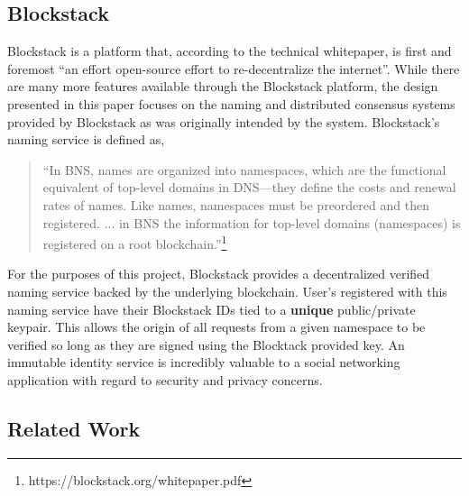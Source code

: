 \documentclass[pageno]{jpaper}
\newcommand{\quotes}[1]{``#1''}
\begin{document}
\begin{multicols*}{2}
\subsection{Blockstack}
\label{section:blockstack}

Blockstack\cite{blockstack1} is a platform that, according to the technical whitepaper, is first and foremost \quotes{an effort open-source effort to re-decentralize the internet}. While there are many more features available through the Blockstack platform, the design presented in this paper focuses on the naming and distributed consensus systems provided by Blockstack as was originally intended by the system\cite{blockstack2}. Blockstack's naming service is defined as,\newline

\begin{quote}
	\quotes{In BNS, names are organized into namespaces, which are the functional equivalent of top-level domains in DNS—they define the costs and renewal rates of names. Like names, namespaces must be preordered and then registered. ... in BNS the information for top-level domains (namespaces) is registered on a
		root blockchain.}\footnote{https://blockstack.org/whitepaper.pdf}
\end{quote}

For the purposes of this project, Blockstack provides a decentralized verified naming service backed by the underlying blockchain. User's registered with this naming service have their Blockstack IDs tied to a \textbf{unique} public/private keypair. This allows the origin of all requests from a given namespace to be verified so long as they are signed using the Blocktack provided key. An immutable identity service is incredibly valuable to a social networking application with regard to security and privacy concerns. 

\subsection{Related Work}
\label{section:related work}


\end{multicols*}
\end{document}
